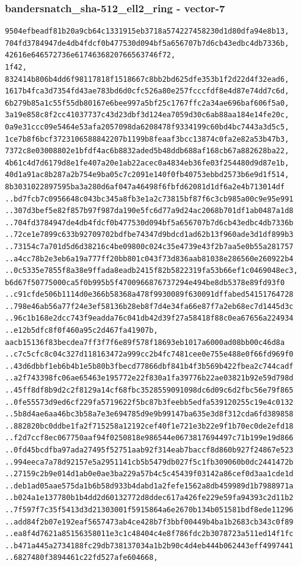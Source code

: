 \documentclass[
]{article}
\begin{document}
\subsubsection{bandersnatch\_sha-512\_ell2\_ring -
vector-7}\label{bandersnatch_sha-512_ell2_ring---vector-7}

\begin{verbatim}
9504efbeadf81b20a9cb64c1331915eb3718a574227458230d1d80dfa94e8b13,
704fd3784947de4db4fdcf0b477530d094bf5a656707b7d6cb43edbc4db7336b,
42616e646572736e6174636820766563746f72,
1f42,
832414b806b4dd6f98117818f1518667c8bb2bd625dfe353b1f2d22d4f32ead6,
1617b4fca3d7354fd43ae783bd6d0cfc526a80e257fcccfdf8e4d87e74dd7c6d,
6b279b85a1c55f55db80167e6bee997a5bf25c1767ffc2a34ae696baf606f5a0,
3a19e858c8f2cc41037737c43d23dbf3d124ea7059d30c6ab88aa184e14fe20c,
0a9e31ccc09e5464e53afa2057098da6208478f9334199c60bd4bc7443a3d5c5,
1ce7b8f6bcf3723106588842207b1199b8feaaf3bcc13874c0fa2e82a53b47b3,
7372c8e03008802e1bfdf4ac6b8832aded5b48ddb688af168cb67a882628ba22,
4b61c4d7d6179d8e1fe407a20e1ab22acec0a4834eb36fe03f254480d9d87e1b,
40d1a91ac8b287a2b754e9ba05c7c2091e140f0fb40753ebbd2573b6e9d1f514,
8b3031022897595ba3a280d6af047a46498f6fbfd62081d1df6a2e4b713014df
..bd7fcb7c0956648c043bc345a8fb3e1a2c73815bf87f6c3cb985a00c9e95e991
..307d3bef5e82f857b97f987da190e5fc6d77a9d24ac2068b701df1ab0487a1d8
..704fd3784947de4db4fdcf0b477530d094bf5a656707b7d6cb43edbc4db7336b
..72ce1e7899c633b92709702bdfbe74347d9bdcd1ad62b13f960ade3d1df899b3
..73154c7a701d5d6d38216c4be09800c024c35e4739e43f2b7aa5e0b55a281757
..a4cc78b2e3eb6a19a777ff20bb801c043f73d836aab81038e286560e260922b4
..0c5335e7855f8a38e9ffada8eadb2415f82b5822319fa53b66ef1c0469048ec3,
b6d67f50775000ca5f0b995b5f4700966876737294e494be8db5378e89fd93f0
..c91cfde506b1114d0e366b58368a478f9930089f630091dffabed54151764728
..798e46ab56a77f24e3ef58136b28eb8f7d4e34fa66e87f7a2eb68ec7d1445d3c
..96c1b168e2dcc743f9eadda76c041db42d39f27a58418f88c0ea67656a224934
..e12b5dfc8f0f460a95c2d467fa41907b,
aacb15136f83becdea7ff3f7f6e89f578f18693eb1017a6000ad08bb00c46d8a
..c7c5cfc8c04c327d118163472a999cc2b4fc7481cee0e755e488e0f66fd969f0
..43d6dbbf1eb6b4b1e5b80b3fbecd77866dbf841b4f3b569b422fbea2c744cadf
..a2f743398fc06ae65463e195772e22f830a1fa39776b22ae03821b92e59d798d
..45ff8df8b9d2c2f8129a14cf68fbc3528559091098dc6d09c6d2fbc56e79f865
..0fe55573d9ed6cf229fa5719622f5bc87b3feebb5edfa539120255c19e4c0132
..5b8d4ae6aa46bc3b58a7e3e694785d9e9b99147ba635e3d8f312cda6fd389858
..882820bc0ddbe1fa2f715258a12192cef40f1e721e3b22e9f1b70ec0de2efd18
..f2d7ccf8ec067750aaf94f0250818e986544e0673817694497c71b199e19d866
..0fd45bcdfba97ada27495f52751aab92f314eab7baccf8d860b927f24867e523
..994eeca7a78d92157e5a2951141cb5b5479db027f5c1fb309060b0dc2441472b
..27159c2b9e014d1ab0e0ae3ba229a57b4c5c45439f03142a86cef0d3aa1cde1d
..deb1ad05aae575da1b6b58d933b4dabd1a2fefe1562a8db459989d1b7988971a
..b024a1e137780b1b4dd2d60132772d8ddec617a426fe229e59fa94393c2d11b2
..7f597f7c35f5413d3d21303001f5915864a6e2670b134b051581bdf8ede11296
..add84f2b07e192eaf5657473ab4ce428b7f3bbf00449b4ba1b2683cb343c0f89
..ea8f4d7621a85156358011e3c1c48404c4e8f786fdc2b3078723a511ed14f1fc
..b471a445a2734188fc29db738137034a1b2b90c4d4eb444b062443eff4997441
..6827480f3894461c22fd527afe604668,
\end{verbatim}
\end{document}
